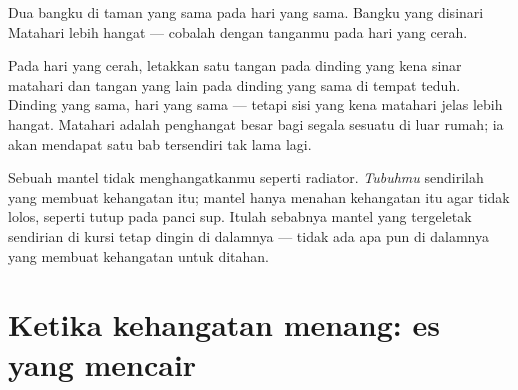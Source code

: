 \begin{omfigure}

{\small Dua bangku di taman yang sama pada hari yang sama. Bangku yang
disinari Matahari lebih hangat --- cobalah dengan tanganmu pada hari
yang cerah.}
\end{omfigure}

\begin{example}\label{ex:g1:hot-and-cold:sunshade}
Pada hari yang cerah, letakkan satu tangan pada dinding yang kena
sinar matahari dan tangan yang lain pada dinding yang sama di tempat
teduh. Dinding yang sama, hari yang sama --- tetapi sisi yang kena
matahari jelas lebih hangat. Matahari adalah penghangat besar bagi
segala sesuatu di luar rumah; ia akan mendapat satu bab tersendiri tak
lama lagi.
\end{example}

\begin{remark}\label{rem:g1:hot-and-cold:coat}
Sebuah mantel tidak menghangatkanmu seperti radiator. \emph{Tubuhmu}
sendirilah yang membuat kehangatan itu; mantel hanya menahan
kehangatan itu agar tidak lolos, seperti tutup pada panci sup. Itulah
sebabnya mantel yang tergeletak sendirian di kursi tetap dingin di
dalamnya --- tidak ada apa pun di dalamnya yang membuat kehangatan
untuk ditahan.
\end{remark}

\section{Ketika kehangatan menang: es yang mencair}

